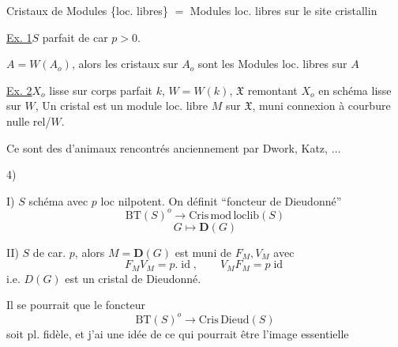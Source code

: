Cristaux de Modules \{loc. libres\} $=$ Modules loc. libres sur le site cristallin

\uline{Ex. 1}\quad $S$   parfait de car $p>0$.

$A=W(A_o)$, alors les cristaux sur $A_o$ sont les Modules loc. libres sur $A$

\uline{Ex. 2}\quad $X_o$ lisse sur corps parfait $k$, $W=W(k)$,
$\mathfrak X$ remontant $X_o$ en schéma  lisse sur $W$,
Un cristal est un module loc. libre $M$ sur $\mathfrak X$, muni connexion à courbure nulle rel/$W$.

Ce sont des  d'animaux  rencontrés anciennement par Dwork, Katz, $\ldots$

4)

I) $S$ schéma avec $p$ loc nilpotent. On définit ``foncteur de Dieudonné''
\[
\mathrm{BT}(S)^o\longrightarrow\mathrm{Cris}\,\mathrm{mod}\,\mathrm{loclib}(S)
\]
\[
G\longmapsto\mathbf D(G)
\]

II)  $S$ de car. $p$, alors $M=\mathbf D(G)$ est muni de $F_M,V_M$ avec
\[
F_MV_M=p.\operatorname{id},\qquad V_MF_M=p\operatorname{id}
\]
i.e. $D(G)$ est un cristal de Dieudonné.

Il se pourrait que le foncteur \unsure{!}
\[
\mathrm{BT}(S)^o\longrightarrow\mathrm{Cris}\,\mathrm{Dieud}(S)
\]
soit pl. fidèle, et j'ai une idée de ce qui pourrait être l'image essentielle
